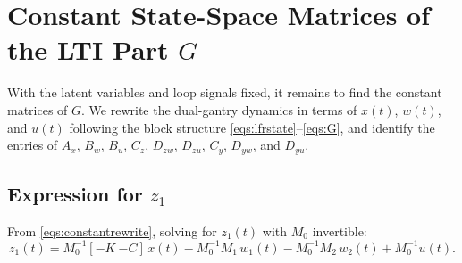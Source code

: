 \documentclass[11pt]{article}
\begin{document}
\section{Constant State-Space Matrices of the LTI Part $G$}
With the latent variables and loop signals fixed, it remains to find the
constant matrices of $G$. We rewrite the dual-gantry dynamics in terms of $x(t)$,
$w(t)$, and $u(t)$ following the block structure
\eqref{eqs:lfrstate}--\eqref{eqs:G}, and identify the entries of $A_x$, $B_w$, $B_u$,
$C_z$, $D_{zw}$, $D_{zu}$, $C_y$, $D_{yw}$, and $D_{yu}$.

\subsection{Expression for $z_1$}
From \eqref{eqs:constantrewrite}, solving for $z_1(t)$ with $M_0$ invertible:
\begin{equation}
    z_1(t) = M_0^{-1}[-K\ {-C}]\,x(t) - M_0^{-1}M_1\, w_1(t) - M_0^{-1}M_2\, w_2(t) + M_0^{-1}u(t).
    \label{eqs:z1expanded}
\end{equation}
\end{document}
